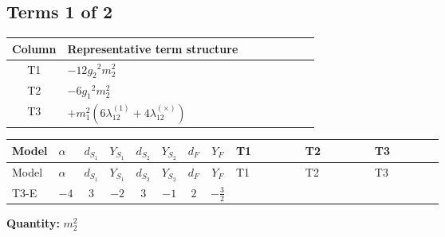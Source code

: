 \documentclass[8pt]{article}
\begin{document}
\begin{landscape}
\subsection*{Terms 1 of 2}
\begin{center}
\begin{tabular}{@{}c >{\raggedright\arraybackslash}p{0.82\linewidth}@{}}
\toprule
Column & Representative term structure \\
\midrule
T1 & \(\displaystyle -12 {g_2}^2 {m_2^2}\) \\
\midrule
T2 & \(\displaystyle -6 {g_1}^2 {m_2^2}\) \\
\midrule
T3 & \(\displaystyle +{m_1^2} (6 {\lambda_{12}^{(1)}}+4 {\lambda_{12}^{(\times)}})\) \\
\midrule
\bottomrule
\end{tabular}
\end{center}
\smallskip
\tiny
\begin{longtable}{@{}llcccccc >{\raggedright\arraybackslash}p{0.21\linewidth} >{\raggedright\arraybackslash}p{0.21\linewidth} >{\raggedright\arraybackslash}p{0.21\linewidth}@{}}
\toprule
Model & $\alpha$ & $d_{S_1}$ & $Y_{S_1}$ & $d_{S_2}$ & $Y_{S_2}$ & $d_F$ & $Y_F$ & T1 & T2 & T3 \\
\midrule
\endfirsthead
\toprule
Model & $\alpha$ & $d_{S_1}$ & $Y_{S_1}$ & $d_{S_2}$ & $Y_{S_2}$ & $d_F$ & $Y_F$ & T1 & T2 & T3 \\
\midrule
\endhead
T3-E & $-4$ & $3$ & $-2$ & $3$ & $-1$ & $2$ & $-\frac{3}{2}$ & \scriptsize\adjustbox{max width=\linewidth}{$\begin{gathered} -12 {g_2}^2 {m_2^2}\end{gathered}$} & \scriptsize\adjustbox{max width=\linewidth}{$\begin{gathered} -6 {g_1}^2 {m_2^2}\end{gathered}$} & \scriptsize\adjustbox{max width=\linewidth}{$\begin{gathered} +{m_1^2} (6 {\lambda_{12}^{(1)}}+4 {\lambda_{12}^{(\times)}})\end{gathered}$} \\
\midrule
\bottomrule
\end{longtable}
\clearpage
\noindent\textbf{Quantity: }$m_2^2$\par\smallskip

\end{landscape}
\end{document}
